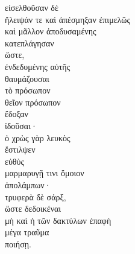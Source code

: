 
{\large
\begin{greek}
\noindent εἰσελθοῦσαν δὲ \\
ἤλειψάν τε καὶ ἀπέσμηξαν ἐπιμελῶς \\
καὶ μᾶλλον ἀποδυσαμένης \\
κατεπλάγησαν\\
\tabto{2em} ὥστε,\\
\tabto{4em} ἐνδεδυμένης αὐτῆς \\
\tabto{2em} θαυμάζουσαι \\
\tabto{4em} τὸ πρόσωπον \\
\tabto{2em} θεῖον πρόσωπον \\
\tabto{4em} ἔδοξαν \\
\tabto{6em} ἰδοῦσαι· \\
ὁ χρὼς γὰρ λευκὸς \\
ἔστιλψεν \\
\tabto{2em} εὐθὺς \\
\tabto{2em} μαρμαρυγῇ τινι ὅμοιον \\
ἀπολάμπων· \\
τρυφερὰ δὲ σάρξ, \\
\tabto{2em} ὥστε δεδοικέναι \\
\tabto{4em} μὴ καὶ ἡ τῶν δακτύλων ἐπαφὴ \\
\tabto{4em} μέγα τραῦμα \\
\tabto{4em} ποιήσῃ. \\

\end{greek}
}

